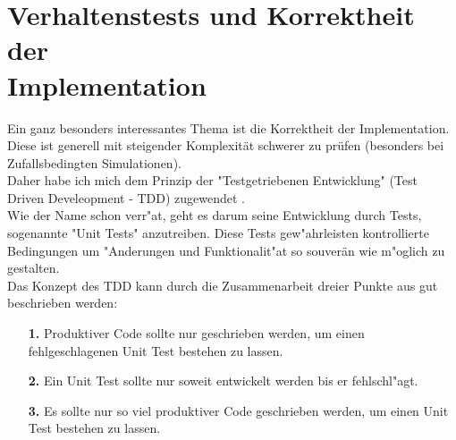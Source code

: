 \documentclass[11pt, a4paper, german]{article}
\theoremstyle{plain}
\begin{document}
\clearpage
\section{Verhaltenstests und Korrektheit der \\Implementation}
Ein ganz besonders interessantes Thema ist die Korrektheit der Implementation. Diese ist generell mit steigender Komplexität schwerer zu prüfen (besonders bei Zufallsbedingten Simulationen).\\
Daher habe ich mich dem Prinzip der "{}Testgetriebenen Entwicklung"{}  (Test Driven Develeopment - TDD) zugewendet \cite{martin2007professionalism}.\\
Wie der Name schon verr"at, geht es darum seine Entwicklung durch Tests, sogenannte "{}Unit Tests"{} anzutreiben. Diese Tests gew"ahrleisten kontrollierte Bedingungen um "Anderungen und Funktionalit"at so souverän wie m"oglich zu gestalten.\\
Das Konzept des TDD kann durch die Zusammenarbeit dreier Punkte aus \cite{martin2008clean} gut beschrieben werden:
\begin{itemize}
	\item[\textbf{1.}] Produktiver Code sollte nur geschrieben werden, um einen fehlgeschlagenen Unit Test bestehen zu lassen.
	\item[\textbf{2.}] Ein Unit Test sollte nur soweit entwickelt werden bis er fehlschl"agt.
	\item[\textbf{3.}] Es sollte nur so viel produktiver Code geschrieben werden, um einen Unit Test bestehen zu lassen. \label{3Punkte}
\end{itemize}
\end{document}
